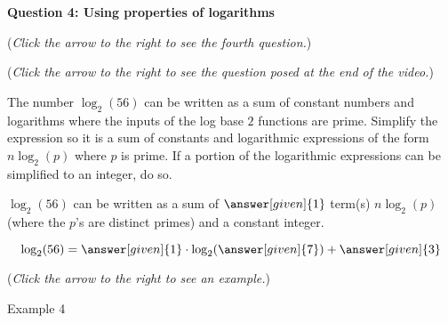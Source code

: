\documentclass{ximera}
\begin{document}
\textbf{Question 4: Using properties of logarithms}
\begin{question}
\begin{flushright}
{\color{blue}(\emph{Click the arrow to the right to see the fourth question.})}
\end{flushright}
\begin{center}
\begin{expandable}
{\color{blue}(\emph{Click the arrow to the right to see the question
posed at the end of the video.})}
\begin{expandable}
The number $\log_2(56)$ can be written as a sum of constant numbers
and  logarithms where the inputs of the log base $2$ functions are prime.
Simplify the expression so it is a sum of constants and logarithmic
expressions of the form $n\log_2(p)$ where $p$ is prime. If a portion
of the logarithmic expressions can be simplified to an integer, do so.\\
\begin{center}
$\log_2(56)$ can be written as a sum of $\answer[given]{1}$ term(s)
$n\log_2(p)$ (where the $p$'s are distinct primes) and a constant integer.
\end{center}
\begin{feedback}
\[
\log_2(56) = \answer[given]{1}\cdot \log_2 (\answer[given]{7}) + \answer[given]{3}
\]
\end{feedback}
\begin{flushright}
{\color{blue}(\emph{Click the arrow to the right to see an example.})}
\end{flushright}
\begin{expandable}
Example 4
\end{expandable}
\end{expandable}
\end{expandable}
\end{center}
\end{question}
\end{document}
